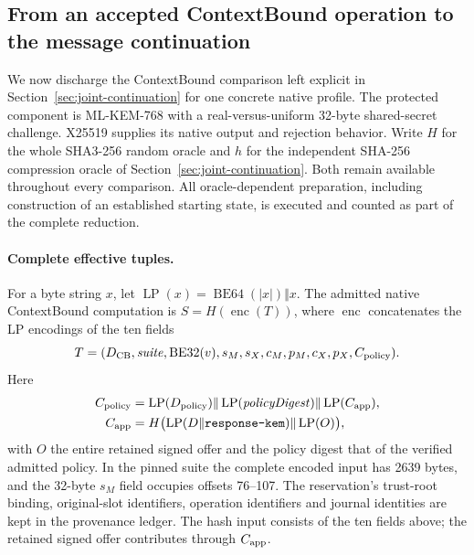 \subsection{From an accepted ContextBound operation to the message continuation}
\label{sec:contextbound-connection}

We now discharge the ContextBound comparison left explicit in
Section~\ref{sec:joint-continuation} for one concrete native profile.
The protected component is ML-KEM-768 with a real-versus-uniform 32-byte
shared-secret challenge. X25519 supplies its native output and rejection
behavior. Write $H$ for the whole SHA3-256 random oracle and
$h$ for the independent SHA-256 compression oracle of
Section~\ref{sec:joint-continuation}. Both remain available throughout every
comparison. All oracle-dependent preparation, including construction of an
established starting state, is executed and counted as part of the complete
reduction.

\paragraph{Complete effective tuples.}
For a byte string $x$, let
$\operatorname{LP}(x)=\operatorname{BE64}(|x|)\Vert x$.
The admitted native ContextBound computation is $S=H(\operatorname{enc}(T))$,
where $\operatorname{enc}$ concatenates the LP encodings of the ten fields
\[
 T=(D_{\rm CB},\mathit{suite},\operatorname{BE32}(v),
 s_M,s_X,c_M,p_M,c_X,p_X,C_{\rm policy}).
\]
Here
\[
\begin{aligned}
 C_{\rm policy}
 &=\operatorname{LP}(D_{\rm policy})
   \Vert\operatorname{LP}(\mathit{policyDigest})
   \Vert\operatorname{LP}(C_{\rm app}),\\
 C_{\rm app}
 &=H\bigl(\operatorname{LP}(D\Vert\texttt{response-kem})
                \Vert\operatorname{LP}(O)\bigr),
\end{aligned}
\]
with $O$ the entire retained signed offer and the policy digest that of the
verified admitted policy. In the pinned suite the complete encoded input
has 2639 bytes, and the 32-byte $s_M$ field occupies offsets 76--107.
The reservation's trust-root binding, original-slot identifiers, operation
identifiers and journal identities are kept in the provenance ledger.
The hash input consists of the ten fields above; the retained signed offer
contributes through $C_{\rm app}$.

